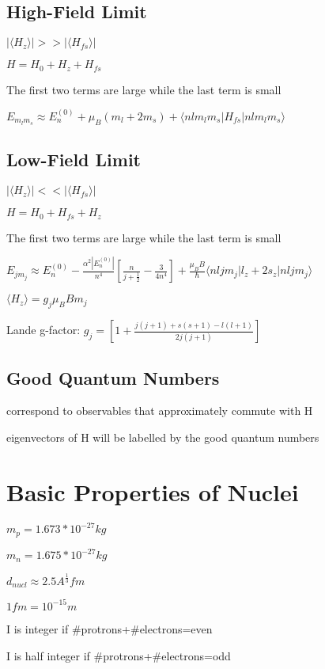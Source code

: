 \documentclass[12pt]{article}
\begin{document}
\begin{spacing}{2.0}
\subsection{High-Field Limit}

$|\langle H_z \rangle| >> |\langle H_{fs} \rangle|$

$H= H_0 +H_z + H_{fs}$

The first two terms are large while the last term is small

$E_{m_l m_s} \approx E_n^{(0)} + \mu_B (m_l +2m_s) + \langle n l m_l m_s |H_{fs}| n l m_l m_s \rangle$

\subsection{Low-Field Limit}

$|\langle H_z \rangle| << |\langle H_{fs} \rangle|$

$H= H_0 +H_{fs} + H_{z}$

The first two terms are large while the last term is small

$E_{j m_j} \approx E_n^{(0)} - \frac{\alpha^2 |E_n^{(0)}|}{n^4} \left[ \frac{n}{j+\frac{1}{2}} - \frac{3}{4n^4} \right] + \frac{\mu_B B}{\hbar} \langle n l j m_j |l_z+2s_z| n l j m_j \rangle$

$\langle H_z \rangle = g_j \mu_B B m_j$

Lande g-factor: $g_j = \left[ 1+ \frac{j(j+1)+s(s+1)-l(l+1)}{2j(j+1)} \right]$

\subsection{Good Quantum Numbers}

correspond to observables that approximately commute with H

eigenvectors of H will be labelled by the good quantum numbers

\section{Basic Properties of Nuclei}

$m_p=1.673*10^{-27} kg$

$m_n = 1.675*10^{-27} kg$

$d_{nucl} \approx 2.5 A^{\frac{1}{3}} fm$

$1 fm = 10^{-15} m$

I is integer if \#protrons+\#electrons=even

I is half integer if \#protrons+\#electrons=odd


\end{spacing}
\end{document}
